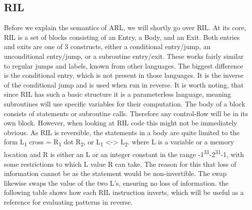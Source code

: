 \documentclass[a4paper]{article}
\begin{document}
\subsection{RIL}
\label{sec:orgffae8b3}
Before we explain the semantics of ARL, we will shortly go over RIL. At its core, RIL is a set of blocks consisting of an Entry, a Body, and an Exit. Both entries and exits are one of 3 constructs, either a conditional entry/jump, an unconditional entry/jump, or a subroutine entry/exit. These works fairly similar to regular jumps and labels, known from other languages. The biggest difference is the conditional entry, which is not present in those languages. It is the inverse of the conditional jump and is used when run in reverse. It is worth noting, that since RIL has such a basic structure it is a parameterless language, meaning subroutines will use specific variables for their computation. The body of a block consists of statements or subroutine calls. Therefore any control-flow will be in its own block. However, when looking at RIL code this might not be immediately obvious. As RIL is reversible, the statements in a body are quite limited to the form L\textsubscript{1} cross = R\textsubscript{1} dot R\textsubscript{2}, or L\textsubscript{1} <-> L\textsubscript{2}. where L is a variable or a memory location and R is either an L or an integer constant in the range -1\textsuperscript{31}-2\textsuperscript{31}-1, with some restrictions to which L value R can take. The reason for this that loss of information cannot be as the statement would be non-invertible. The swap likewise swaps the value of the two L's, ensuring no loss of information. the following table shows how each RIL instruction inverts, which will be useful as a reference for evaluating patterns in reverse.
\end{document}
